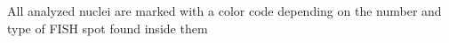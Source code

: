 \label{fig:VisGoal} All analyzed nuclei are marked with a color code depending on the number and type of FISH spot found inside them
